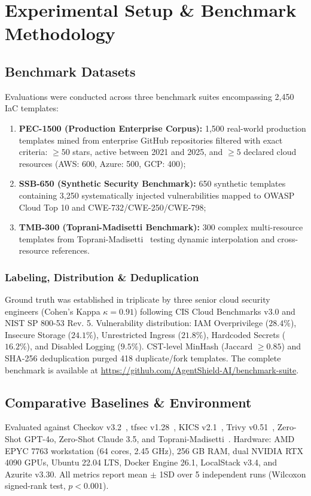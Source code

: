\documentclass[runningheads]{llncs}
\begin{document}
\section{Experimental Setup \& Benchmark Methodology}

\subsection{Benchmark Datasets}
Evaluations were conducted across three benchmark suites encompassing 2,450 IaC templates:
\begin{enumerate}
    \item \textbf{PEC-1500 (Production Enterprise Corpus):} 1,500 real-world production templates mined from enterprise GitHub repositories filtered with exact criteria: $\ge 50$ stars, active between 2021 and 2025, and $\ge 5$ declared cloud resources (AWS: 600, Azure: 500, GCP: 400);
    \item \textbf{SSB-650 (Synthetic Security Benchmark):} 650 synthetic templates containing 3,250 systematically injected vulnerabilities mapped to OWASP Cloud Top 10 and CWE-732/CWE-250/CWE-798;
    \item \textbf{TMB-300 (Toprani-Madisetti Benchmark):} 300 complex multi-resource templates from Toprani-Madisetti~\cite{toprani2025automated} testing dynamic interpolation and cross-resource references.
\end{enumerate}

\subsubsection{Labeling, Distribution \& Deduplication}
Ground truth was established in triplicate by three senior cloud security engineers (Cohen's Kappa $\kappa = 0.91$) following CIS Cloud Benchmarks v3.0 and NIST SP 800-53 Rev. 5. Vulnerability distribution: IAM Overprivilege ($28.4\%$), Insecure Storage ($24.1\%$), Unrestricted Ingress ($21.8\%$), Hardcoded Secrets ($16.2\%$), and Disabled Logging ($9.5\%$). CST-level MinHash (Jaccard $\ge 0.85$) and SHA-256 deduplication purged 418 duplicate/fork templates. The complete benchmark is available at \url{https://github.com/AgentShield-AI/benchmark-suite}.

\subsection{Comparative Baselines \& Environment}
Evaluated against Checkov v3.2~\cite{checkov2024}, tfsec v1.28~\cite{tfsec2023}, KICS v2.1~\cite{kics2022}, Trivy v0.51~\cite{trivy2024}, Zero-Shot GPT-4o, Zero-Shot Claude 3.5, and Toprani-Madisetti~\cite{toprani2025automated}. Hardware: AMD EPYC 7763 workstation (64 cores, 2.45 GHz), 256 GB RAM, dual NVIDIA RTX 4090 GPUs, Ubuntu 22.04 LTS, Docker Engine 26.1, LocalStack v3.4, and Azurite v3.30. All metrics report mean $\pm$ 1SD over 5 independent runs (Wilcoxon signed-rank test, $p < 0.001$).
\end{document}
